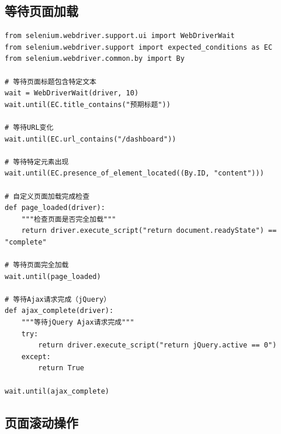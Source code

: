 \subsection{等待页面加载}

\begin{lstlisting}[style=demostyle,numbers=none]
from selenium.webdriver.support.ui import WebDriverWait
from selenium.webdriver.support import expected_conditions as EC
from selenium.webdriver.common.by import By

# 等待页面标题包含特定文本
wait = WebDriverWait(driver, 10)
wait.until(EC.title_contains("预期标题"))

# 等待URL变化
wait.until(EC.url_contains("/dashboard"))

# 等待特定元素出现
wait.until(EC.presence_of_element_located((By.ID, "content")))

# 自定义页面加载完成检查
def page_loaded(driver):
    """检查页面是否完全加载"""
    return driver.execute_script("return document.readyState") == "complete"

# 等待页面完全加载
wait.until(page_loaded)

# 等待Ajax请求完成（jQuery）
def ajax_complete(driver):
    """等待jQuery Ajax请求完成"""
    try:
        return driver.execute_script("return jQuery.active == 0")
    except:
        return True

wait.until(ajax_complete)
\end{lstlisting}

\subsection{页面滚动操作}

